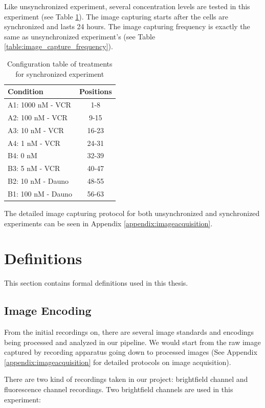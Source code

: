 \documentclass[pdftex,12pt,a4paper]{report}
\begin{document}
Like unsynchronized experiment, several concentration levels are tested in this experiment (see Table \ref{table:syn_treatments}). The image capturing starts after the cells are synchronized and lasts 24 hours. The image capturing frequency is exactly the same as unsynchronized experiment's (see Table \ref{table:image_capture_frequency}).

\begin{table}[H]
\centering
\begin{tabular}{| l | c |}
\hline
Condition & Positions \\
\hline
A1: 1000 nM - VCR & 1-8 \\
A2: 100 nM - VCR & 9-15 \\
A3: 10 nM - VCR & 16-23 \\
A4: 1 nM - VCR & 24-31 \\
B4: 0 nM & 32-39 \\
B3: 5 nM - VCR & 40-47 \\
B2: 10 nM - Dauno & 48-55 \\
B1: 100 nM - Dauno & 56-63 \\
\hline
\end{tabular}
\caption{Configuration table of treatments for synchronized experiment}
\label{table:syn_treatments}
\end{table}

The detailed image capturing protocol for both unsynchronized and synchronized experiments can be seen in Appendix \ref{appendix:imageacquisition}.

\section{Definitions}

This section contains formal definitions used in this thesis.

\subsection{Image Encoding}

From the initial recordings on, there are several image standards and encodings being processed and analyzed in our pipeline. We would start from the raw image captured by recording apparatus going down to processed images (See Appendix \ref{appendix:imageacquisition}	 for detailed protocols on image acquisition).

There are two kind of recordings taken in our project: brightfield channel and fluorescence channel recordings. Two brightfield channels are used in this experiment:
\end{document}
